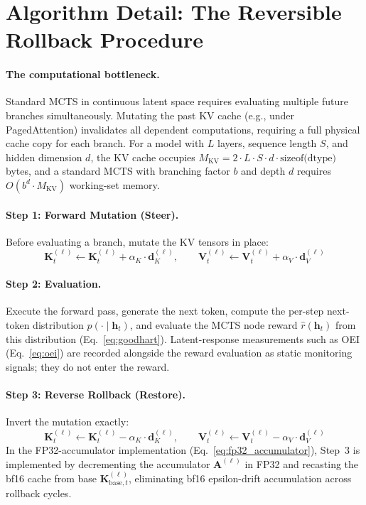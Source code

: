 \documentclass{article}
\begin{document}
\section{Algorithm Detail: The Reversible Rollback Procedure}\label{sec:appendix-algorithm}

\paragraph{The computational bottleneck.} Standard MCTS in continuous latent space requires evaluating multiple future branches simultaneously. Mutating the past KV cache (e.g., under PagedAttention) invalidates all dependent computations, requiring a full physical cache copy for each branch. For a model with $L$ layers, sequence length $S$, and hidden dimension $d$, the KV cache occupies $M_{\text{KV}} = 2 \cdot L \cdot S \cdot d \cdot \text{sizeof(dtype)}$ bytes, and a standard MCTS with branching factor $b$ and depth $d$ requires $O(b^d \cdot M_{\text{KV}})$ working-set memory.

\paragraph{Step 1: Forward Mutation (Steer).} Before evaluating a branch, mutate the KV tensors in place:
\begin{equation}
\mathbf{K}_t^{(\ell)} \leftarrow \mathbf{K}_t^{(\ell)} + \alpha_K \cdot \mathbf{d}_K^{(\ell)}, \qquad \mathbf{V}_t^{(\ell)} \leftarrow \mathbf{V}_t^{(\ell)} + \alpha_V \cdot \mathbf{d}_V^{(\ell)}
\label{eq:forward_mutation}
\end{equation}

\paragraph{Step 2: Evaluation.} Execute the forward pass, generate the next token, compute the per-step next-token distribution $p(\cdot \mid \mathbf{h}_t)$, and evaluate the MCTS node reward $\hat{r}(\mathbf{h}_t)$ from this distribution (Eq.~\ref{eq:goodhart}). Latent-response measurements such as OEI (Eq.~\ref{eq:oei}) are recorded alongside the reward evaluation as static monitoring signals; they do not enter the reward.

\paragraph{Step 3: Reverse Rollback (Restore).} Invert the mutation exactly:
\begin{equation}
\mathbf{K}_t^{(\ell)} \leftarrow \mathbf{K}_t^{(\ell)} - \alpha_K \cdot \mathbf{d}_K^{(\ell)}, \qquad \mathbf{V}_t^{(\ell)} \leftarrow \mathbf{V}_t^{(\ell)} - \alpha_V \cdot \mathbf{d}_V^{(\ell)}
\label{eq:reverse_rollback}
\end{equation}
In the FP32-accumulator implementation (Eq.~\ref{eq:fp32_accumulator}), Step~3 is implemented by decrementing the accumulator $\mathbf{A}^{(\ell)}$ in FP32 and recasting the bf16 cache from base $\mathbf{K}_{\text{base},t}^{(\ell)}$, eliminating bf16 epsilon-drift accumulation across rollback cycles.
\end{document}
